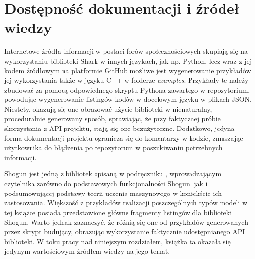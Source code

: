 
\section{Dostępność dokumentacji i źródeł wiedzy}

Internetowe źródła informacji w postaci forów społecznościowych skupiają się na wykorzystaniu biblioteki Shark w innych językach, jak np. Python, lecz wraz z jej kodem źródłowym na platformie GitHub \cite{shogun:github} możliwe jest wygenerowanie przykładów jej wykorzystania także w języku C++ w folderze \textit{examples}. Przykłady te należy zbudować za pomocą odpowiednego skryptu Pythona zawartego w repozytorium, powodując wygenerowanie listingów kodów w docelowym języku w plikach JSON. Niestety, okazują się one obrazować użycie biblioteki w nienaturalny, proceduralnie generowany sposób, sprawiając, że przy faktycznej próbie skorzystania z API projektu, stają się one bezużyteczne. Dodatkowo, jedyna forma dokumentacji projektu ogranicza się do komentarzy w kodzie, zmuszając użytkownika do błądzenia po repozytorum w poszukiwaniu potrzebnych informacji. 

Shogun jest jedną z bibliotek opisaną w podręczniku \cite{handsOnMachineLearning}, wprowadzającym czytelnika zarówno do podstawowych funkcjonalności Shogun, jak i podsumowującej podstawy teorii uczenia maszynowego w kontekście ich zastosowania. Większość z przykładów realizacji poszczególnych typów modeli w tej książce posiada przedstawione główne fragmenty listingów dla biblioteki Shogun. Warto jednak zaznaczyć, że różnią się one od przykładów generowanych przez skrypt budujący, obrazując wykorzystanie faktycznie udostępnianego API biblioteki. W toku pracy nad niniejszym rozdziałem, książka ta okazała się jedynym wartościowym źródłem wiedzy na jego temat.